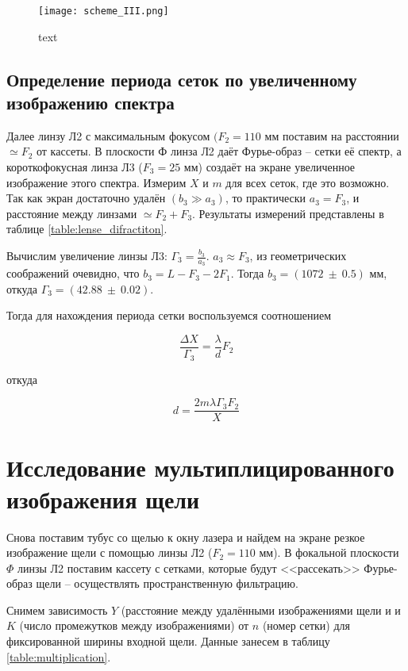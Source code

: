     \begin{figure}[h!]
    	\centering
    	\texttt{[image: scheme\_III.png]}
    	\caption{text}
    \end{figure}
    
    \subsection{Определение периода сеток по увеличенному изображению спектра}
    
    Далее линзу Л2 с максимальным фокусом $(F_2 = 110$ мм поставим на расстоянии $\simeq F_{2}$ от кассеты. В плоскости Ф линза Л2 даёт Фурье-образ -- сетки её спектр, а короткофокусная линза Л3 ($F_3 = 25$ мм) создаёт на экране увеличенное изображение этого спектра.
    Измерим $X$ и $m$ для всех сеток, где это возможно. Так как экран достаточно удалён $\left(b_{3} \gg a_{3}\right)$, то практически $a_{3}=F_{3}$, и расстояние между линзами $\simeq F_{2}+F_{3}$. Результаты измерений представлены в таблице \ref{table:lense_difractiton}.

	Вычислим увеличение линзы Л3: $\Gamma_3 = \frac{b_3}{a_3}$. $a_3 \approx F_3$, из геометрических соображений очевидно, что $b_3 = L - F_3 - 2F_1$. Тогда $b_3 = (1072 ~ \pm ~ 0.5)$ мм, откуда $\Gamma_3 = (42.88 ~ \pm ~ 0.02)$.
	
	Тогда для нахождения периода сетки воспользуемся соотношением
	
	\begin{equation}
		\frac{\Delta X}{\Gamma_3} = \frac{\lambda}{d} F_2
	\end{equation}
	
	откуда
	
	\[ d = \frac{2 m \lambda \Gamma_3 F_2}{X} \]

    \section{Исследование мультиплицированного изображения щели}
    
    Снова поставим тубус со щелью к окну лазера и найдем на экране резкое изображение щели с помощью линзы Л2 ($F_2 = 110$ мм). В фокальной плоскости $\Phi$ линзы Л2 поставим кассету с сетками, которые будут <<рассекать>> Фурье-образ щели -- осуществлять пространственную фильтрацию.
    
    Снимем зависимость $Y$ (расстояние между удалёнными изображениями щели и и $K$ (число промежутков между изображениями) от $n$ (номер сетки) для фиксированной ширины входной щели. Данные занесем в таблицу \ref{table:multiplication}.
    
